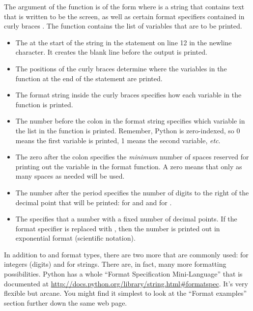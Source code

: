 \documentclass[letterpaper,10pt,english]{sphinxmanual}
\begin{document}
The argument of the  function is of the form  where   is a string that contains text that is written to be the screen, as well as certain format specifiers contained in curly braces \code{\{\}}.  The  function contains the list of variables that are to be printed.
\begin{itemize}
\item {} 
The  at the start of the string in the  statement on line 12 in the newline character.  It creates the blank line before the output is printed.

\item {} 
The positions of the curly braces determine where the variables in the  function at the end of the statement are printed.

\item {} 
The format string inside the curly braces specifies how each variable in the  function is printed.

\item {} 
The number before the colon in the format string specifies which variable in the list in the  function is printed.  Remember, Python is zero-indexed, so 0 means the first variable is printed, 1 means the second variable, \emph{etc}.

\item {} 
The zero after the colon specifies the \emph{minimum} number of spaces reserved for printing out the variable in the format function. A zero means that only as many spaces as needed will be used.

\item {} 
The number after the period specifies the number of digits to the right of the decimal point that will be printed:  for  and  and  for .

\item {} 
The  specifies that a number with a fixed number of decimal points.  If the  format specifier is replaced with , then the number is printed out in exponential format (scientific notation).

\end{itemize}

In addition to  and  format types, there are two more that are commonly used:  for integers (digits) and  for strings.  There are, in fact, many more formatting possibilities.  Python has a whole ``Format Specification Mini-Language'' that is documented at \href{http://docs.python.org/library/string.html\#formatspec}{http://docs.python.org/library/string.html\#formatspec}.  It's very flexible but arcane.  You might find it simplest to look at the ``Format examples'' section further down the same web page.
\end{document}
